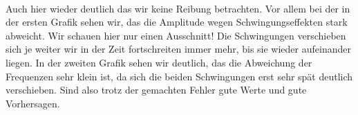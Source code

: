 \documentclass{article}
\begin{document}
                  \\
                  Auch hier wieder deutlich das wir keine Reibung betrachten. Vor allem bei der in der ersten Grafik sehen wir, das die Amplitude wegen Schwingungseffekten stark abweicht.
                  Wir schauen hier nur einen Ausschnitt! Die Schwingungen verschieben sich je weiter wir in der Zeit fortschreiten immer mehr, bis sie wieder aufeinander liegen.
                  In der zweiten Grafik sehen wir deutlich, das die Abweichung der Frequenzen sehr klein ist, da sich die beiden Schwingungen erst sehr spät deutlich verschieben.
                  Sind also trotz der gemachten Fehler gute Werte und gute Vorhersagen.
\end{document}
